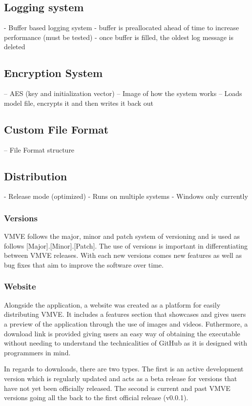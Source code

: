 \documentclass[11pt]{article}
\begin{document}
\subsection{Logging system}
- Buffer based logging system
- buffer is preallocated ahead of time to increase performance (must be tested)
- once buffer is filled, the oldest log message is deleted

\subsection{Encryption System}
-- AES (key and initialization vector)
-- Image of how the system works 
  -- Loads model file, encrypts it and then writes it back out

\subsection{Custom File Format}
-- File Format structure



\subsection{Distribution}
- Release mode (optimized)
- Runs on multiple systems
- Windows only currently

\subsubsection{Versions}
VMVE follows the major, minor and patch system of versioning and is used as
follows [Major].[Minor].[Patch]. The use of versions is important in
differentiating between VMVE releases. With each new versions comes new features
as well as bug fixes that aim to improve the software over time. 

\subsubsection{Website}
Alongside the application, a website was created as a platform for easily distributing VMVE.
It includes a features section that showcases and gives users a preview of the application
through the use of images and videos. Futhermore, a download link is provided
giving users an easy way of obtaining the executable without needing to
understand the technicalities of GitHub as it is designed with programmers in mind.

In regards to downloads, there are two types. The first is an active development
version which is regularly updated and acts as a beta release for versions that
have not yet been officially released. The second is current and past VMVE versions
going all the back to the first official release (v0.0.1).
\end{document}
